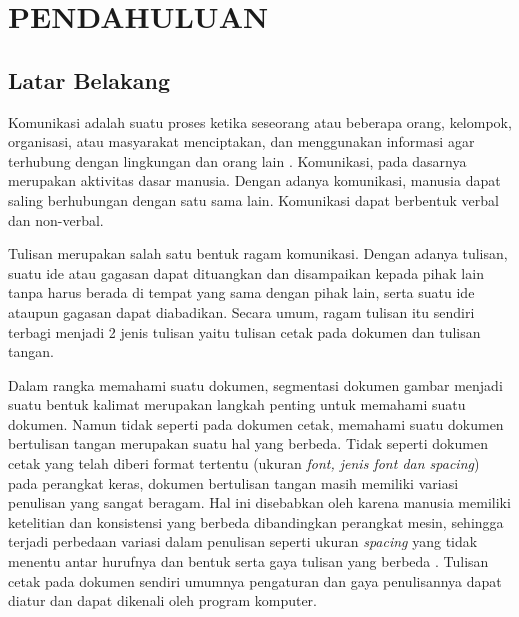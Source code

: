 
\chapter{PENDAHULUAN}
\label{chap:pendahuluan}


\section{Latar Belakang}
\label{sec:latarbelakang}

Komunikasi adalah suatu proses ketika seseorang atau beberapa orang, kelompok, organisasi, atau masyarakat menciptakan, dan menggunakan informasi agar terhubung dengan lingkungan dan orang lain \citep*{ruben2006communication}. Komunikasi, pada dasarnya merupakan aktivitas dasar manusia. Dengan adanya komunikasi, manusia dapat saling berhubungan dengan satu sama lain. Komunikasi dapat berbentuk verbal dan non-verbal. \par

Tulisan merupakan salah satu bentuk ragam komunikasi. Dengan adanya tulisan, suatu ide atau gagasan dapat dituangkan dan disampaikan kepada pihak lain tanpa harus berada di tempat yang sama dengan pihak lain, serta suatu ide ataupun gagasan dapat diabadikan. Secara umum, ragam tulisan itu sendiri terbagi menjadi 2 jenis tulisan yaitu tulisan cetak pada dokumen dan tulisan tangan.\par

Dalam rangka memahami suatu dokumen, segmentasi dokumen gambar menjadi suatu bentuk kalimat merupakan langkah penting untuk memahami suatu dokumen. Namun tidak seperti pada dokumen cetak, memahami suatu dokumen bertulisan tangan merupakan suatu hal yang berbeda. Tidak seperti dokumen cetak yang telah diberi format tertentu (ukuran \textit{font, \textnormal{jenis} font \textnormal{dan} spacing}) pada perangkat keras, dokumen bertulisan tangan masih memiliki variasi penulisan yang sangat beragam. Hal ini disebabkan oleh karena manusia memiliki ketelitian dan konsistensi yang berbeda dibandingkan perangkat mesin, sehingga terjadi perbedaan variasi dalam penulisan seperti ukuran \textit{spacing} yang tidak menentu antar hurufnya dan bentuk serta gaya tulisan yang berbeda \citep*{ryu2015word}. Tulisan cetak pada dokumen sendiri umumnya pengaturan dan gaya penulisannya dapat diatur dan dapat dikenali oleh program komputer.\par

